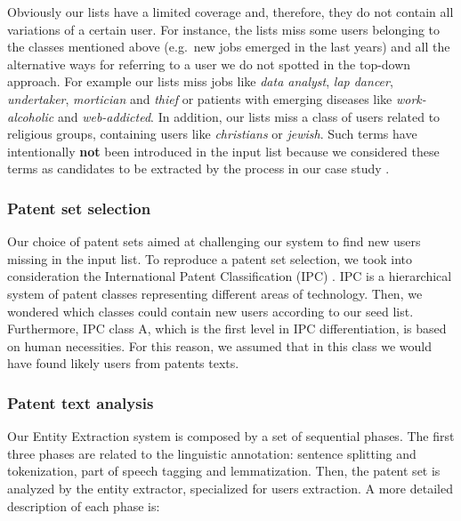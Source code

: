 \documentclass[]{book}
\begin{document}
Obviously our lists have a limited coverage and, therefore, they do not
contain all variations of a certain user. For instance, the lists miss
some users belonging to the classes mentioned above (e.g.~new jobs
emerged in the last years) and all the alternative ways for referring to
a user we do not spotted in the top-down approach. For example our lists
miss jobs like \emph{data analyst}, \emph{lap dancer},
\emph{undertaker}, \emph{mortician} and \emph{thief} or patients with
emerging diseases like \emph{work-alcoholic} and \emph{web-addicted}. In
addition, our lists miss a class of users related to religious groups,
containing users like \emph{christians} or \emph{jewish}. Such terms
have intentionally \textbf{not} been introduced in the input list
because we considered these terms as candidates to be extracted by the
process in our case study .

\subsubsection{Patent set selection}\label{patsel}

Our choice of patent sets aimed at challenging our system to find new
users missing in the input list. To reproduce a patent set selection, we
took into consideration the International Patent Classification (IPC)
\citep{wipo1}. IPC is a hierarchical system of patent classes
representing different areas of technology. Then, we wondered which
classes could contain new users according to our seed list. Furthermore,
IPC class A, which is the first level in IPC differentiation, is based
on human necessities. For this reason, we assumed that in this class we
would have found likely users from patents texts.

\subsubsection{Patent text analysis}\label{patent-text-analysis}

Our Entity Extraction system is composed by a set of sequential phases.
The first three phases are related to the linguistic annotation:
sentence splitting and tokenization, part of speech tagging and
lemmatization. Then, the patent set is analyzed by the entity extractor,
specialized for users extraction. A more detailed description of each
phase is:
\end{document}
